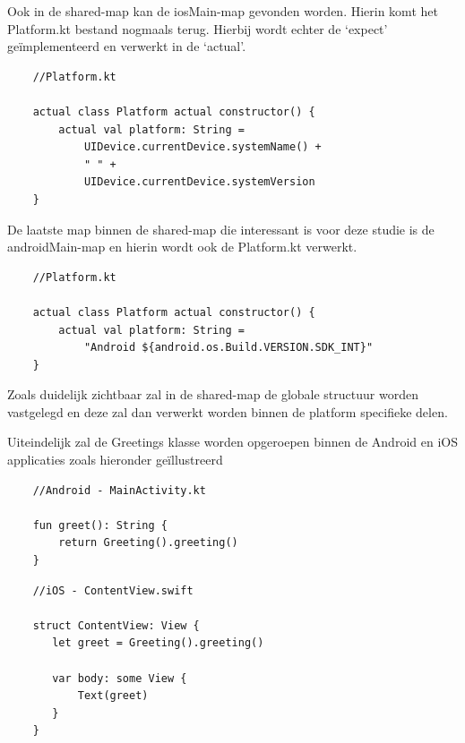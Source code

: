 Ook in de shared-map kan de iosMain-map gevonden worden. Hierin komt het Platform.kt bestand nogmaals terug. Hierbij wordt echter de `expect' geïmplementeerd en verwerkt in de `actual'. 

\begin{lstlisting}
    //Platform.kt
    
    actual class Platform actual constructor() {
        actual val platform: String = 
            UIDevice.currentDevice.systemName() + 
            " " + 
            UIDevice.currentDevice.systemVersion
    }
\end{lstlisting}

De laatste map binnen de shared-map die interessant is voor deze studie is de androidMain-map en hierin wordt ook de Platform.kt verwerkt.

\begin{lstlisting}
    //Platform.kt
    
    actual class Platform actual constructor() {
        actual val platform: String = 
            "Android ${android.os.Build.VERSION.SDK_INT}"
    }
\end{lstlisting}

Zoals duidelijk zichtbaar zal in de shared-map de globale structuur worden vastgelegd en deze zal dan verwerkt worden binnen de platform specifieke delen.

Uiteindelijk zal de Greetings klasse worden opgeroepen binnen de Android en iOS applicaties zoals hieronder geïllustreerd
\begin{lstlisting}
    //Android - MainActivity.kt
    
    fun greet(): String {
        return Greeting().greeting()
    }
\end{lstlisting}
\begin{lstlisting}
    //iOS - ContentView.swift
    
    struct ContentView: View {
       let greet = Greeting().greeting()
       
       var body: some View {
           Text(greet)
       }
    }
   
\end{lstlisting}

\section{}
\label{sec:M-first-native}

\subsection{}
\label{sec:M-first-native-android}

\subsection{}
\label{sec:M-first-native-ios}

